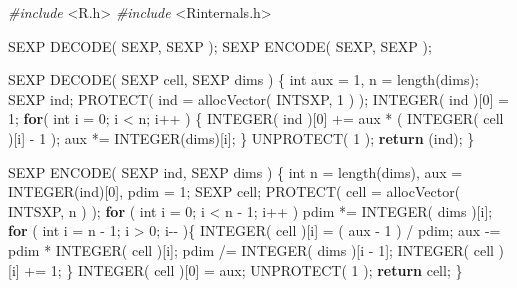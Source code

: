 \documentclass[
  12pt,
]{book}
\newenvironment{Shaded}{\begin{snugshade}}{\end{snugshade}}
\newcommand{\ControlFlowTok}[1]{\textcolor[rgb]{0.13,0.29,0.53}{\textbf{#1}}}
\newcommand{\DataTypeTok}[1]{\textcolor[rgb]{0.13,0.29,0.53}{#1}}
\newcommand{\DecValTok}[1]{\textcolor[rgb]{0.00,0.00,0.81}{#1}}
\newcommand{\ImportTok}[1]{#1}
\newcommand{\NormalTok}[1]{#1}
\newcommand{\PreprocessorTok}[1]{\textcolor[rgb]{0.56,0.35,0.01}{\textit{#1}}}
\begin{document}
\begin{Shaded}
\begin{Highlighting}[]
\PreprocessorTok{\#include }\ImportTok{\textless{}R.h\textgreater{}}
\PreprocessorTok{\#include }\ImportTok{\textless{}Rinternals.h\textgreater{}}

\NormalTok{SEXP DECODE( SEXP, SEXP );}
\NormalTok{SEXP ENCODE( SEXP, SEXP );}

\NormalTok{SEXP}
\NormalTok{  DECODE( SEXP cell, SEXP dims )}
\NormalTok{  \{}
    \DataTypeTok{int}\NormalTok{             aux = }\DecValTok{1}\NormalTok{, n = length(dims);}
\NormalTok{    SEXP            ind;}
\NormalTok{    PROTECT( ind = allocVector( INTSXP, }\DecValTok{1}\NormalTok{ ) );}
\NormalTok{    INTEGER( ind )[}\DecValTok{0}\NormalTok{] = }\DecValTok{1}\NormalTok{;}
    \ControlFlowTok{for}\NormalTok{( }\DataTypeTok{int}\NormalTok{ i = }\DecValTok{0}\NormalTok{; i \textless{} n; i++ ) \{}
\NormalTok{      INTEGER( ind )[}\DecValTok{0}\NormalTok{] += aux * ( INTEGER( cell )[i] {-} }\DecValTok{1}\NormalTok{ );}
\NormalTok{      aux *= INTEGER(dims)[i];}
\NormalTok{    \}}
\NormalTok{    UNPROTECT( }\DecValTok{1}\NormalTok{ );}
    \ControlFlowTok{return}\NormalTok{ (ind);}
\NormalTok{  \}}

\NormalTok{SEXP}
\NormalTok{  ENCODE( SEXP ind, SEXP dims )}
\NormalTok{  \{}
    \DataTypeTok{int}\NormalTok{             n = length(dims), aux = INTEGER(ind)[}\DecValTok{0}\NormalTok{], pdim = }\DecValTok{1}\NormalTok{;}
\NormalTok{    SEXP            cell;}
\NormalTok{    PROTECT( cell = allocVector( INTSXP, n ) );}
    \ControlFlowTok{for}\NormalTok{ ( }\DataTypeTok{int}\NormalTok{ i = }\DecValTok{0}\NormalTok{; i \textless{} n {-} }\DecValTok{1}\NormalTok{; i++ )}
\NormalTok{      pdim *= INTEGER( dims )[i];}
    \ControlFlowTok{for}\NormalTok{ ( }\DataTypeTok{int}\NormalTok{ i = n {-} }\DecValTok{1}\NormalTok{; i \textgreater{} }\DecValTok{0}\NormalTok{; i{-}{-} )\{}
\NormalTok{      INTEGER( cell )[i] = ( aux {-} }\DecValTok{1}\NormalTok{ ) / pdim;}
\NormalTok{      aux {-}= pdim * INTEGER( cell )[i];}
\NormalTok{      pdim /= INTEGER( dims )[i {-} }\DecValTok{1}\NormalTok{];}
\NormalTok{      INTEGER( cell )[i] += }\DecValTok{1}\NormalTok{;}
\NormalTok{    \}}
\NormalTok{    INTEGER( cell )[}\DecValTok{0}\NormalTok{] = aux;}
\NormalTok{    UNPROTECT( }\DecValTok{1}\NormalTok{ );}
    \ControlFlowTok{return}\NormalTok{ cell;}
\NormalTok{  \}}
\end{Highlighting}
\end{Shaded}
\end{document}
